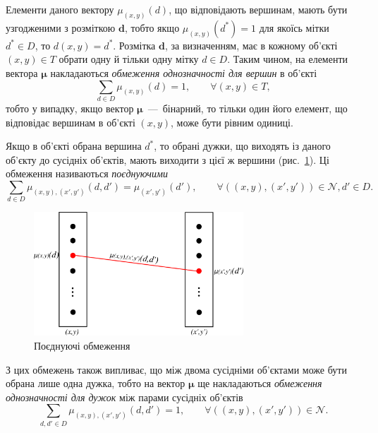 Елементи даного вектору $\mu_{\left(x, y \right)} \left(d \right)$,
що відповідають вершинам, мають бути узгодженими з розміткою $\pmb{d}$,
тобто якщо $\mu_{\left(x, y \right)} \left(d^* \right) = 1$ для якоїсь мітки
$d^* \in D$,
то $d \left(x, y \right) = d^*$.
Розмітка $\pmb{d}$, за визначенням,
має в кожному об'єкті $\left(x, y \right) \in T$
обрати одну й тільки одну мітку $d \in D$.
Таким чином, на елементи вектора $\pmb{\mu}$
накладаються \textit{обмеження однозначності для вершин} в об'єкті
\begin{equation} \label{vetrex:unambiguity}
    \sum \limits_{d \in D} \mu_{\left( x, y \right)} \left( d \right) = 1,
    \qquad \forall \left(x, y \right) \in T,
\end{equation}
тобто у випадку, якщо вектор $\pmb{\mu}$~---~бінарний,
то тільки один його елемент,
що відповідає вершинам в об'єкті $\left(x, y \right)$, може бути рівним одиниці.

Якщо в об'єкті обрана вершина $d^*$, то обрані дужки,
що виходять із даного об'єкту до сусідніх об'єктів,
мають виходити з цієї ж вершини (рис.~\ref{fig:combining:constraints}).
Ці обмеження називаються \textit{поєднуючими}
\begin{equation} \label{combining:constraints}
    \sum \limits_{d \in D}
        \mu_{\left(x, y \right), \left(x', y' \right)} \left(d, d' \right) =
        \mu_{\left(x', y' \right)} \left(d' \right), \qquad
    \forall
    \left( \left(x, y \right), \left(x',y' \right) \right) \in \mathcal{N},
    d' \in D.
\end{equation}

\begin{figure}[h]
  \centering
  \includegraphics[width=0.7\textwidth]{images/combining_constraints}
  \caption{Поєднуючі обмеження}
  \label{fig:combining:constraints}
\end{figure}

З цих обмежень також випливає,
що між двома сусідніми об'єктами може бути обрана лише одна дужка,
тобто на вектор $\pmb{\mu}$
ще накладаються \textit{обмеження однозначності для дужок}
між парами сусідніх об'єктів
\begin{equation} \label{edge:unambiguity}
    \sum \limits_{d, d' \in D}
        \mu_{\left(x, y \right), \left(x', y' \right)} \left(d, d' \right) = 1,
        \qquad \forall
        \left(\left(x, y \right), \left(x', y' \right) \right) \in \mathcal{N}.
\end{equation}

